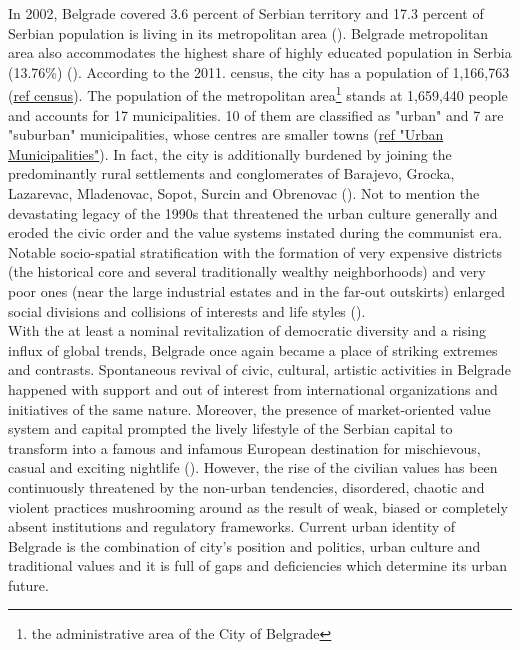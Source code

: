 \documentclass[11pt]{report}
\begin{document}
In 2002, Belgrade covered 3.6 percent of Serbian territory and 17.3 percent of Serbian population is living in its metropolitan area (\cite{Cities in Transition 2013}).
Belgrade metropolitan area also accommodates the highest share of highly educated population in Serbia (13.76\%) (\href{ref}{\citealt{vukmirovic_city_2013}}).
According to the 2011. census, the city has a population of 1,166,763 (\href{ref}{ref census}).
The population of the metropolitan area\footnote{the administrative area of the City of Belgrade}                 
stands at 1,659,440 people and accounts for 17 municipalities.
10 of them are classified as "urban" and 7 are "suburban" municipalities, whose centres are smaller towns (\href{ref}{ref "Urban Municipalities"}).
In fact, the  city  is additionally burdened by joining the predominantly rural  settlements  and  conglomerates  of Barajevo, Grocka,  Lazarevac,  Mladenovac,  Sopot,  Surcin  and Obrenovac (\href{ref}{\citealt{doytchinov_belgrade_2015}}).
Not to mention the devastating legacy of the 1990s that threatened the  urban  culture generally and eroded the civic order and the value systems instated during the communist era.
Notable socio-spatial stratification with the formation of very expensive districts (the historical core and several traditionally wealthy neighborhoods) and very poor ones (near the large industrial estates and in the far-out outskirts) enlarged social divisions and collisions of interests and life styles (\href{ref}{\citealt{hirt_belgrade_2009}}).
\\

With the at least a nominal revitalization of democratic diversity and a rising influx of global trends, Belgrade once again became a place of striking extremes and contrasts. 
Spontaneous revival of civic, cultural, artistic activities in Belgrade happened with support and out of interest from international organizations and initiatives of the same nature.
Moreover, the presence of market-oriented value system and capital prompted the lively lifestyle of the Serbian capital to transform into a famous and infamous European destination for mischievous, casual and exciting nightlife (\href{ref}{\citealt{doytchinov_urban_2015}}).
However, the rise of the civilian values has been continuously threatened by the non-urban tendencies, disordered, chaotic  and violent practices mushrooming around as the result of weak, biased or completely absent institutions and regulatory frameworks.
Current urban identity of Belgrade is the combination of city's position and politics, urban culture and traditional values and it is full of gaps and deficiencies which determine its urban future.
\\
\end{document}

